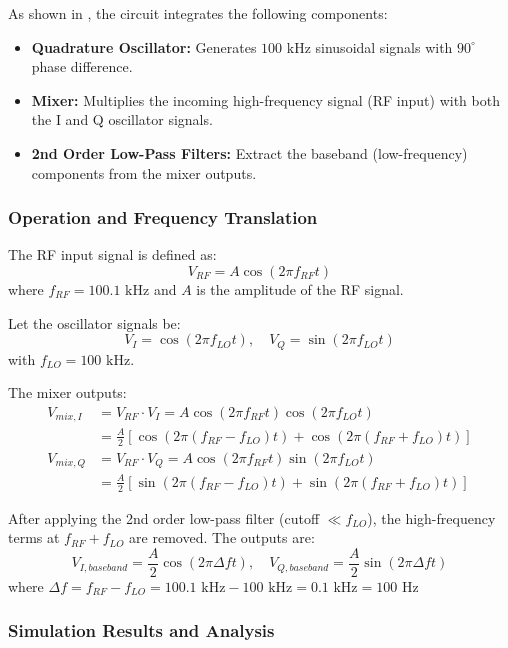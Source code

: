 As shown in , the circuit integrates the following components:
\begin{itemize}
    \item \textbf{Quadrature Oscillator:} Generates $100\text{ kHz}$ sinusoidal signals with $90^\circ$ phase difference.
    \item \textbf{Mixer:} Multiplies the incoming high-frequency signal (RF input) with both the I and Q oscillator signals.
    \item \textbf{2nd Order Low-Pass Filters:} Extract the baseband (low-frequency) components from the mixer outputs.
\end{itemize}

\subsubsection{Operation and Frequency Translation}

The RF input signal is defined as:
\[
V_{RF} = A \cos(2\pi f_{RF} t)
\]
where $f_{RF} = 100.1\text{ kHz}$ and $A$ is the amplitude of the RF signal.

Let the oscillator signals be:
\[
V_I = \cos(2\pi f_{LO} t), \quad V_Q = \sin(2\pi f_{LO} t)
\]
with $f_{LO} = 100\text{ kHz}$.

The mixer outputs:
\begin{align*}
V_{mix,I} &= V_{RF} \cdot V_I = A \cos(2\pi f_{RF} t) \cos(2\pi f_{LO} t) \\
          &= \frac{A}{2} \left[ \cos(2\pi (f_{RF} - f_{LO}) t) + \cos(2\pi (f_{RF} + f_{LO}) t) \right] \\
V_{mix,Q} &= V_{RF} \cdot V_Q = A \cos(2\pi f_{RF} t) \sin(2\pi f_{LO} t) \\
          &= \frac{A}{2} \left[ \sin(2\pi (f_{RF} - f_{LO}) t) + \sin(2\pi (f_{RF} + f_{LO}) t) \right]
\end{align*}

After applying the 2nd order low-pass filter (cutoff $\ll f_{LO}$), the high-frequency terms at $f_{RF} + f_{LO}$ are removed. The outputs are:
\[
V_{I,baseband} = \frac{A}{2} \cos(2\pi \Delta f t), \quad V_{Q,baseband} = \frac{A}{2} \sin(2\pi \Delta f t)
\]
where $\Delta f = f_{RF} - f_{LO} = 100.1\text{ kHz} - 100\text{ kHz} = 0.1\text{ kHz} = 100\text{ Hz}$

\subsubsection{Simulation Results and Analysis}

